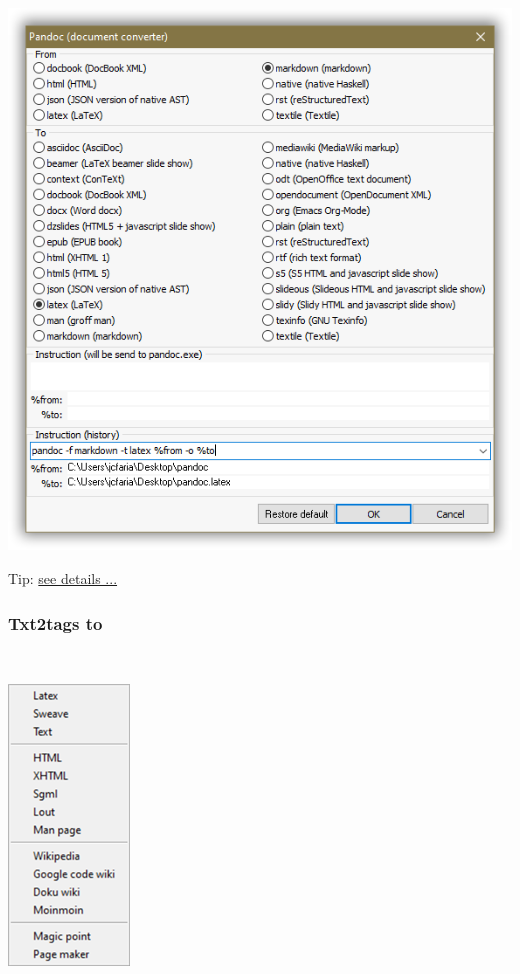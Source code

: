 \includegraphics[scale=.50]{./res/pandoc.png}

Tip: \href{http://johnmacfarlane.net/pandoc/index.html}{see details ...}


\newpage
\hypertarget{menu_tools_processing_conversion_txt2tags}{}
\subsubsection{Txt2tags to}\\

\includegraphics[scale=0.50]{./res/menu_tools_processing_conversion_txt2tags.png}\\

